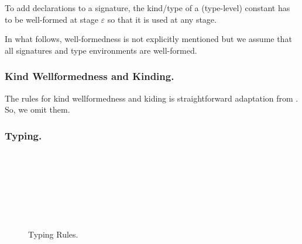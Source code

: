 To add declarations to a signature, the kind/type of a (type-level)
constant has to be well-formed at stage \(\varepsilon\) so that it is
used at any stage. 

In what follows, well-formedness is not explicitly mentioned but
we assume that all signatures and type environments are well-formed.

\subsubsection{Kind Wellformedness and Kinding.}

The rules for kind wellformedness and kiding is straightforward
adaptation from \LLF.  So, we omit them.

\subsubsection{Typing.}

\begin{figure}
  \begin{center}
     \hfil
     \\[2mm]
     \\[2mm]
     \\[2mm]
     \\[2mm]
     \andalso
     \\[2mm]
     \\[2mm]
     \andalso
    \caption{Typing Rules.}
    \label{fig:typing-rules}
  \end{center}
\end{figure}

